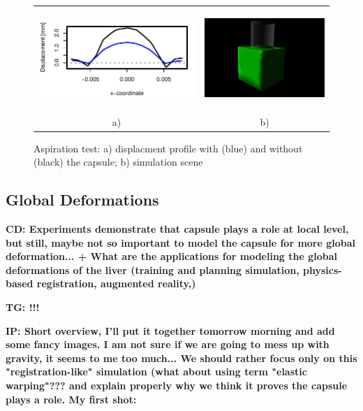\documentclass{llncs}
\newcommand{\TG}[1]{{\color{blue}\textbf{TG: #1}}}
\newcommand{\CD}[1]{{\color{green}\textbf{CD: #1}}}
\newcommand{\IP}[1]{{\color{cyan}\textbf{IP: #1}}}
\begin{document}
\begin{figure}[htb]
  \centering
  \begin{tabular}{cc}
    \includegraphics[width=3in]{aspiration.pdf} &
    \includegraphics[height=1.5in]{aspiration.jpg}\\
    a) & b)
  \end{tabular}

  \caption{\label{fig-aspiration}Aspiration test: a) displacment profile
  with (blue) and without (black) the capsule; b) simulation scene}
\end{figure}






\subsection{Global Deformations}
\CD{ Experiments demonstrate that capsule plays a role at local level, but still, maybe not so important to model the capsule for more global deformation...
+ What are the applications for modeling the global deformations of the liver (training and planning simulation, physics-based registration, augmented reality,)}


\TG{!!!}


\IP{Short overview, I'll put it together tomorrow morning and add some fancy images. I am not sure if we are going to mess up 
with gravity, it seems to me too much... We should rather focus only on this "registration-like" simulation (what about 
using term "elastic warping"??? and explain properly why we think it proves the capsule plays a role. My first shot:}
\end{document}
